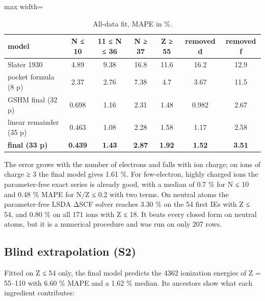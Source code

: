 \documentclass[aps,pra,preprint,notitlepage,superscriptaddress,amsmath,amssymb]{revtex4-2}
\begin{document}
\begin{table}[htbp]
\caption{All-data fit, MAPE in \%.}
\footnotesize\linespread{1}\selectfont\setlength{\tabcolsep}{5pt}\renewcommand{\arraystretch}{1.1}
\begin{adjustbox}{max width=\linewidth}
\begin{tabular}{lcccccc}
\hline\hline
model & N ≤ 10 & 11 ≤ N ≤ 36 & N ≥ 37 & Z ≥ 55 & removed d & removed f \\
\hline
Slater 1930 & 4.89 & 9.38 & 16.8 & 11.6 & 16.2 & 12.9 \\
pocket formula (8 p) & 2.37 & 2.76 & 7.38 & 4.7 & 3.67 & 11.5 \\
GSHM final (32 p) & 0.698 & 1.16 & 2.31 & 1.48 & 0.982 & 2.67 \\
linear remainder (35 p) & 0.463 & 1.08 & 2.28 & 1.58 & 1.17 & 2.58 \\
\textbf{final (33 p)} & \textbf{0.439} & \textbf{1.43} & \textbf{2.87} & \textbf{1.92} & \textbf{1.52} & \textbf{3.51} \\
\hline\hline
\end{tabular}
\end{adjustbox}
\end{table}


The error grows with the number of electrons and falls with ion charge; on ions of charge ≥ 3 the final model gives 1.61 \%. For few-electron, highly charged ions the parameter-free exact series is already good, with a median of 0.7 \% for N ≤ 10 and 0.48 \% MAPE for N/Z ≤ 0.2 with two terms. On neutral atoms the parameter-free LSDA ΔSCF solver reaches 3.30 \% on the 54 first IEs with Z ≤ 54, and 0.80 \% on all 171 ions with Z ≤ 18. It beats every closed form on neutral atoms, but it is a numerical procedure and was run on only 207 rows.


\subsection{Blind extrapolation (S2)}

Fitted on Z ≤ 54 only, the final model predicts the 4362 ionization energies of Z = 55–110 with 6.60 \% MAPE and a 1.62 \% median. Its ancestors show what each ingredient contributes:
\end{document}
